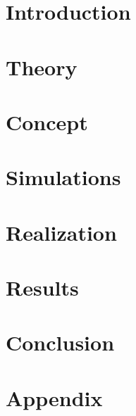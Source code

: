 \documentclass[11pt,a4paper,hidelinks]{article}
\begin{document}










\section{Introduction}\label{sec:introduction}

\pagebreak

\section{Theory}\label{sec:theory}

\pagebreak

\section{Concept}\label{sec:concept}

\pagebreak

\section{Simulations}\label{sec:simulations}

\pagebreak

\section{Realization}\label{sec:realization}

\pagebreak

\section{Results}\label{sec:results}

\pagebreak

\section{Conclusion}\label{sec:conclusion}

\pagebreak

\section{Appendix}\label{sec:appendix}




\end{document}
